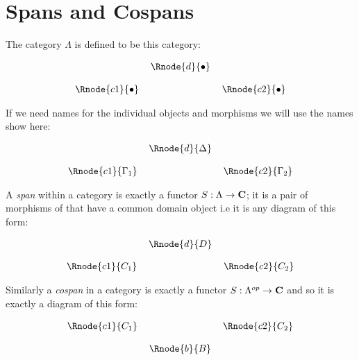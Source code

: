 \documentclass[10pt,a4paper]{scrartcl}
\begin{document}
\section{Spans and Cospans}
\noindent
The category $\Lambda$ is defined to be this category:
\begin{center}
\begin{displaymath}
\setlength{\arraycolsep}{3pt}
\begin{array}{cp{0cm}cp{0cm} c}
            & &\Rnode{d}{\bullet}                  \\ [0.4cm]
\Rnode{c1}{\bullet}& &                & & \Rnode{c2}{\bullet} 
\end{array}
\end{displaymath}
\end{center}

\noindent
If we need names for the individual objects and morphisms we will use the names show here:
\begin{center}
\begin{displaymath}
\setlength{\arraycolsep}{3pt}
\begin{array}{cp{0cm}cp{0cm} c}
            & &\Rnode{d}{\Delta}                  \\ [0.4cm]
\Rnode{c1}{\Gamma_1}& &                & & \Rnode{c2}{\Gamma_2} 
\end{array}
\end{displaymath}
\end{center}

\noindent
A \textit{span} within a category  is exactly a functor 
$S: \Lambda \rightarrow \textbf{C}$; it is a pair of morphisms of  that have a common domain object i.e it is any diagram of this form:

\begin{center}
\begin{equation}
\label{genericspan}
\setlength{\arraycolsep}{3pt}
\begin{array}{cp{0cm}cp{0cm} c}
            & &\Rnode{d}{D}                  \\ [0.4cm]
\Rnode{c1}{C_1}& &                & & \Rnode{c2}{C_2} 
\end{array}
\end{equation}
\end{center}

\noindent Similarly a \textit{cospan} in a category  is exactly a functor $S: \Lambda^{op} \rightarrow \textbf{C}$ and so it is exactly a diagram of this form:
\begin{center}
\begin{equation}
\label{genericcospan}
\setlength{\arraycolsep}{3pt}
\begin{array}{cp{0cm}cp{0cm} c}
\Rnode{c1}{C_1}& &                & & \Rnode{c2}{C_2} \\ [0.4cm]
            & &\Rnode{b}{B}
\end{array}
\end{equation}
\end{center}
\end{document}
